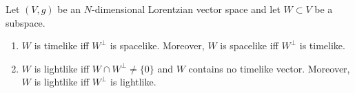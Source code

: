 Let $(V, g)$ be an $N$-dimensional Lorentzian vector space and let $W \subset V$ be a subspace.
\begin{enumerate}
\item[(a)] $W$ is timelike iff $W^\perp$ is spacelike. Moreover, $W$ is spacelike iff $W^\perp$ is timelike.
\item[(b)] $W$ is lightlike iff $W \cap W^\perp \neq \{0\}$ and $W$ contains no timelike vector. Moreover, $W$ is lightlike iff $W^\perp$ is lightlike.
\end{enumerate}
